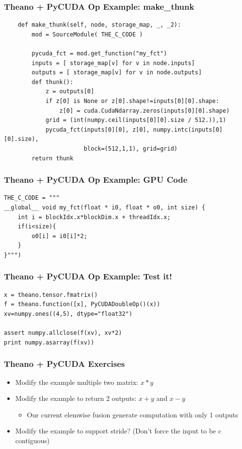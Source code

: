 \documentclass[a4paper,9pt]{beamer}
\begin{document}
\begin{frame}[fragile]
\frametitle{Theano + PyCUDA Op Example: make\_thunk}
\begin{Verbatim}
    def make_thunk(self, node, storage_map, _, _2):
        mod = SourceModule( THE_C_CODE )

        pycuda_fct = mod.get_function("my_fct")
        inputs = [ storage_map[v] for v in node.inputs]
        outputs = [ storage_map[v] for v in node.outputs]
        def thunk():
            z = outputs[0]
            if z[0] is None or z[0].shape!=inputs[0][0].shape:
                z[0] = cuda.CudaNdarray.zeros(inputs[0][0].shape)
            grid = (int(numpy.ceil(inputs[0][0].size / 512.)),1)
            pycuda_fct(inputs[0][0], z[0], numpy.intc(inputs[0][0].size),
                       block=(512,1,1), grid=grid)
        return thunk
\end{Verbatim}
\end{frame}

\begin{frame}[fragile]
\frametitle{Theano + PyCUDA Op Example: GPU Code}
\begin{Verbatim}
THE_C_CODE = """
__global__ void my_fct(float * i0, float * o0, int size) {
    int i = blockIdx.x*blockDim.x + threadIdx.x;
    if(i<size){
        o0[i] = i0[i]*2;
    }
}""")
\end{Verbatim}
\end{frame}


\begin{frame}[fragile]
\frametitle{Theano + PyCUDA Op Example: Test it!}
\begin{Verbatim}
x = theano.tensor.fmatrix()
f = theano.function([x], PyCUDADoubleOp()(x))
xv=numpy.ones((4,5), dtype="float32")

assert numpy.allclose(f(xv), xv*2)
print numpy.asarray(f(xv))
\end{Verbatim}
\end{frame}

\begin{frame}
\frametitle{Theano + PyCUDA Exercises}
\begin{itemize}
\item Modify the example multiple two matrix: $x * y$
\item Modify the example to return 2 outputs: $x + y$ and $x - y$
  \begin{itemize}
  \item Our current elemwise fusion generate computation with only 1 outputs
  \end{itemize}
\item Modify the example to support stride? (Don't force the input to be c contiguous)
\end{itemize}
\end{frame}
\end{document}
